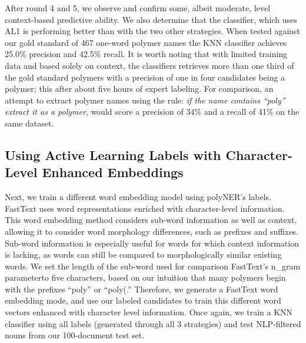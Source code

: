 After round 4 and 5, we observe and confirm some, albeit moderate, level context-based predictive ability.
We also determine that the classifier, which uses AL1 is performing better than with the two other strategies.
When tested against our gold standard of 467 one-word polymer names the KNN classifier achieves 25.0\% precision and  42.5\% recall. 
It is worth noting that with limited training data and based solely on context, the classifiers retrieves more than one third of the gold standard polymers with a precision of one in four candidates being a polymer; this after about five hours of expert labeling. 
For comparison, an attempt to extract polymer names using the rule: \textit{if the name contains ``poly'' extract it as a polymer}, would score a precision of 34\% and a recall of 41\% on the same dataset.


\subsection{Using Active Learning Labels with Character-Level Enhanced Embeddings}
Next, we train a different word embedding model using polyNER's labels.
FastText uses word representations enriched with character-level information.
This word embedding method considers sub-word information as well as
context, allowing it to consider word morphology differences, such as prefixes
and suffixes. Sub-word information is especially useful for words for which
context information is lacking, as words can still be compared to morphologically similar
existing words. We set the length of the sub-word used for comparison\textemdash
FastText's n_gram parameter\textemdash to five characters, based on our intuition that
many polymers begin with the prefixes ``poly'' or ``poly(.'' 
Therefore, we generate a FastText word embedding mode, and use our labeled candidates to train this different word vectors enhanced with character level information.
Once again, we train a KNN classifier using all labels (generated through all 3 strategies)
 and test NLP-filtered nouns from our 100-document test set.

